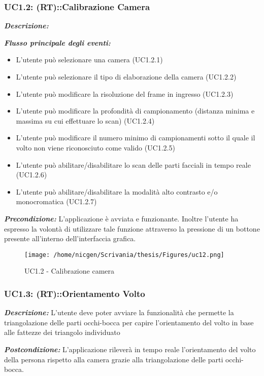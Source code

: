 \subsubsection{UC1.2: (RT)::Calibrazione Camera}

\textbf{\textit{Descrizione:}} 

\textbf{\textit{Flusso principale degli eventi:}} 

\begin{itemize}
\item L'utente può selezionare una camera (UC1.2.1)
\item L'utente può selezionare il tipo di elaborazione della camera (UC1.2.2)
\item L'utente può modificare la risoluzione del frame in ingresso (UC1.2.3)
\item L'utente può modificare la profondità di campionamento (distanza minima e massima su cui effettuare lo scan) (UC1.2.4)
\item L'utente può modificare il numero minimo di campionamenti sotto il quale il volto non viene riconosciuto come valido (UC1.2.5)
\item L'utente può abilitare/disabilitare lo scan delle parti facciali in tempo reale (UC1.2.6)
\item L'utente può abilitare/disabilitare la modalità alto contrasto e/o monocromatica (UC1.2.7)
\end{itemize}

\textbf{\textit{Precondizione:}} L'applicazione è avviata e funzionante. Inoltre l'utente ha espresso la volontà di utilizzare tale funzione attraverso la pressione di un bottone presente all'interno dell'interfaccia grafica.

\begin{figure}[H]\centering  
\texttt{[image: /home/nicgen/Scrivania/thesis/Figures/uc12.png]}
\caption[UC1.2 - Calibrazione camera]{UC1.2 - Calibrazione camera}
\end{figure}

\subsubsection{UC1.3: (RT)::Orientamento Volto}

\textbf{\textit{Descrizione:}} L'utente deve poter avviare la funzionalità che permette la triangolazione delle parti occhi-bocca per capire l'orientamento del volto in base alle fattezze dei triangolo individuato

\textbf{\textit{Postcondizione:}} L'applicazione rileverà in tempo reale l'orientamento del volto della persona rispetto alla camera grazie alla triangolazione delle parti occhi-bocca.


